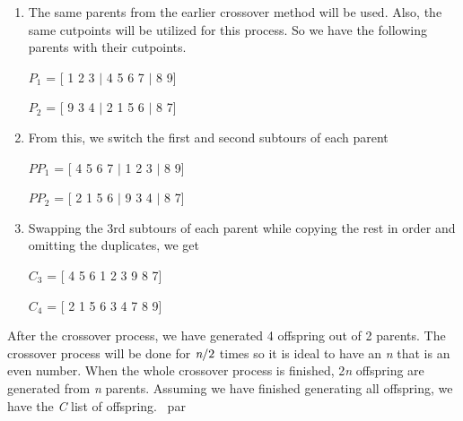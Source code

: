 \begin{enumerate}
	\item The same parents from the earlier crossover method will be used. Also, the same cutpoints will be utilized for this process. So we have the following parents with their cutpoints.\par
	\hfill \par 
	
	$P_{1}$ = [ 1 2 3 $|$ 4 5 6 7 $|$ 8 9] \par 
	$P_{2}$ = [ 9 3 4 $|$ 2 1 5 6 $|$ 8 7] \par
	
	\hfill \par 
	
	\item From this, we switch the first and second subtours of each parent \par 
	
	\hfill \par 
	
	$PP_{1}$ = [ 4 5 6 7 $|$ 1 2 3 $|$ 8 9] \par 
	$PP_{2}$ = [ 2 1 5 6 $|$ 9 3 4 $|$ 8 7] \par
	
	\hfill \par 
	
	\item Swapping the 3rd subtours of each parent while copying the rest in order and omitting the duplicates, we get 
	\par 
	\hfill \par
	$C_{3}$ = [ 4 5 6 1 2 3 9 8 7] \par 
	$C_{4}$ = [ 2 1 5 6 3 4 7 8 9] \par
	
	\hfill \par 
\end{enumerate}

After the crossover process, we have generated 4 offspring out of 2 parents. The crossover process will be done for $\emph{n}/2$ times so it is ideal to have an \emph{n} that is an even number. When the whole crossover process is finished, 2\emph{n} offspring are generated from \emph{n} parents. Assuming we have finished generating all offspring, we have the \emph{C} list of offspring. \ par

